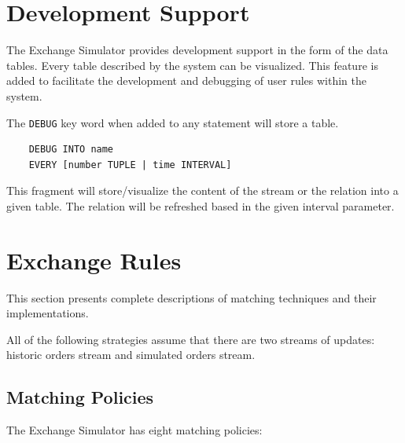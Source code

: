 \documentclass{article}
\begin{document}
\section{Development Support}

The Exchange Simulator provides development support in the form of the data tables. Every table described by the system can be visualized. This feature is added to facilitate the development and debugging of user rules within the system. 

The {\tt DEBUG} key word when added to any statement will store a table.

\begin{verbatim}
    DEBUG INTO name
    EVERY [number TUPLE | time INTERVAL] 
\end{verbatim} 

This fragment will store/visualize the content of the stream or the relation into a given table. The relation will be refreshed based in the given interval parameter.

\section{Exchange Rules}

This section presents complete descriptions of matching techniques and their implementations. 

All of the following strategies assume that there are two streams of updates: historic orders stream and simulated orders stream.

\subsection{Matching Policies}

The Exchange Simulator has eight matching policies:
\end{document}
